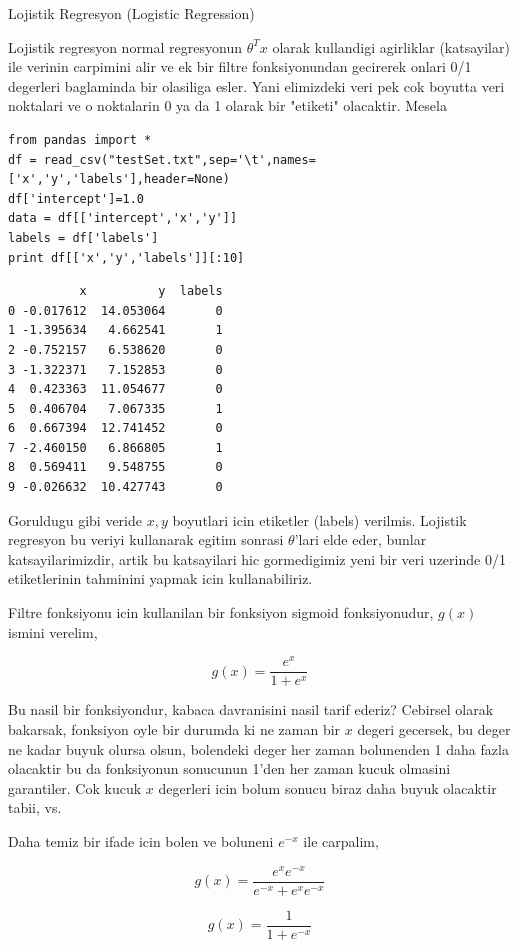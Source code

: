 \documentclass[12pt,fleqn]{article}\usepackage{../common}
\begin{document}
Lojistik Regresyon (Logistic Regression)

Lojistik regresyon normal regresyonun $\theta^T x$ olarak kullandigi agirliklar
(katsayilar) ile verinin carpimini alir ve ek bir filtre fonksiyonundan
gecirerek onlari 0/1 degerleri baglaminda bir olasiliga esler. Yani
elimizdeki veri pek cok boyutta veri noktalari ve o noktalarin 0 ya da 1
olarak bir "etiketi" olacaktir. Mesela

\begin{verbatim}
from pandas import *
df = read_csv("testSet.txt",sep='\t',names=['x','y','labels'],header=None)
df['intercept']=1.0
data = df[['intercept','x','y']]
labels = df['labels']
print df[['x','y','labels']][:10]
\end{verbatim}

\begin{verbatim}
          x          y  labels
0 -0.017612  14.053064       0
1 -1.395634   4.662541       1
2 -0.752157   6.538620       0
3 -1.322371   7.152853       0
4  0.423363  11.054677       0
5  0.406704   7.067335       1
6  0.667394  12.741452       0
7 -2.460150   6.866805       1
8  0.569411   9.548755       0
9 -0.026632  10.427743       0
\end{verbatim}


Goruldugu gibi veride $x,y$ boyutlari icin etiketler (labels)
verilmis. Lojistik regresyon bu veriyi kullanarak egitim sonrasi
$\theta$'lari elde eder, bunlar katsayilarimizdir, artik bu
katsayilari hic gormedigimiz yeni bir veri uzerinde 0/1 etiketlerinin
tahminini yapmak icin kullanabiliriz.

Filtre fonksiyonu icin kullanilan bir fonksiyon sigmoid fonksiyonudur,
$g(x)$ ismini verelim,

$$ g(x) = \frac{e^{x}}{1+e^{x}} $$

Bu nasil bir fonksiyondur, kabaca davranisini nasil tarif ederiz?
Cebirsel olarak bakarsak, fonksiyon oyle bir durumda ki ne zaman bir
$x$ degeri gecersek, bu deger ne kadar buyuk olursa olsun, bolendeki
deger her zaman bolunenden 1 daha fazla olacaktir bu da fonksiyonun
sonucunun 1'den her zaman kucuk olmasini garantiler. Cok kucuk $x$
degerleri icin bolum sonucu biraz daha buyuk olacaktir tabii, vs.

Daha temiz bir ifade icin bolen ve boluneni $e^{-x}$ ile carpalim,

$$ g(x) = \frac{e^{x}e^{-x}}{e^{-x}+e^{x}e^{-x}} $$

$$ g(x) = \frac{1}{1+e^{-x}} $$
\end{document}
